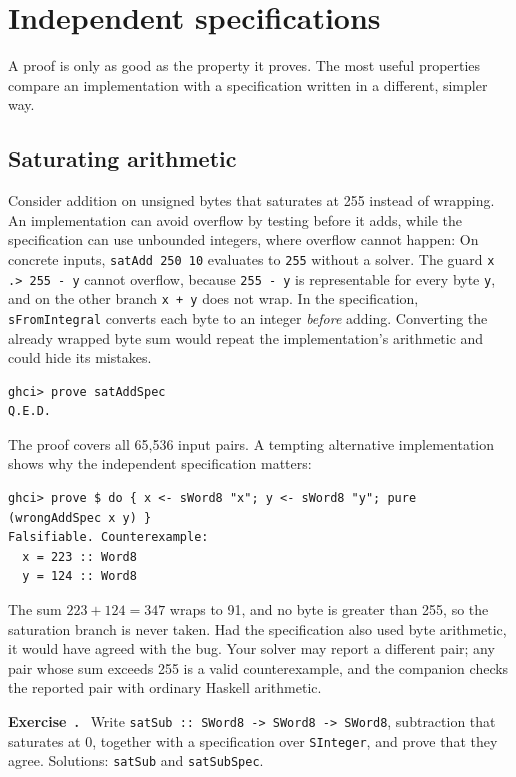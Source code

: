\documentclass[review]{jfp-epi}
\newcommand{\code}[1]{\texttt{#1}}
\newcounter{exercise}
\newenvironment{exercise}{\refstepcounter{exercise}\par\medskip\noindent
  \textbf{Exercise~\theexercise.}\ }{\par\medskip}
\begin{document}
\section{Independent specifications}
\label{sec:specs}

A proof is only as good as the property it proves. The most useful properties
compare an implementation with a specification written in a different, simpler
way.

\subsection{Saturating arithmetic}

Consider addition on unsigned bytes that saturates at 255 instead of wrapping. An implementation can avoid overflow by testing before it adds, while
the specification can use unbounded integers, where overflow cannot happen:
On concrete inputs, \code{satAdd 250 10} evaluates to \code{255} without a solver.
The guard \code{x .> 255 - y} cannot overflow, because \code{255 - y} is
representable for every byte \code{y}, and on the other branch \code{x + y} does
not wrap. In the specification, \code{sFromIntegral} converts each byte to an
integer \emph{before} adding. Converting the already wrapped byte sum would
repeat the implementation's arithmetic and could hide its mistakes.
\begin{lstlisting}
ghci> prove satAddSpec
Q.E.D.
\end{lstlisting}
The proof covers all 65,536 input pairs. A tempting alternative implementation
shows why the independent specification matters:
\begin{lstlisting}[style=output]
ghci> prove $ do { x <- sWord8 "x"; y <- sWord8 "y"; pure (wrongAddSpec x y) }
Falsifiable. Counterexample:
  x = 223 :: Word8
  y = 124 :: Word8
\end{lstlisting}
The sum $223+124=347$ wraps to 91, and no byte is greater than 255, so the
saturation branch is never taken. Had the specification also used byte
arithmetic, it would have agreed with the bug. Your solver may report a different
pair; any pair whose sum exceeds 255 is a valid counterexample, and the companion
checks the reported pair with ordinary Haskell arithmetic.

\begin{exercise}
Write \code{satSub :: SWord8 -> SWord8 -> SWord8}, subtraction that saturates
at 0, together with a specification over \code{SInteger}, and prove that they
agree. Solutions: \code{satSub} and \code{satSubSpec}.
\end{exercise}
\end{document}
